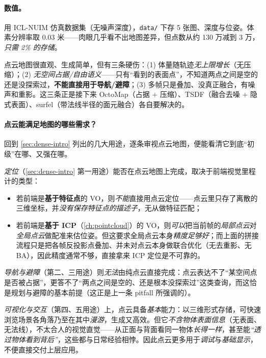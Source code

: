 \paragraph{数值。}
用 ICL-NUIM 仿真数据集（无噪声深度），\texttt{data/} 下存 5 张图、深度与位姿。体素分辨率取 0.03 米——肉眼几乎看不出地图差异，但点数从约 130 万减到 3 万，\emph{只需 2\% 的存储}\cite{gaoxiang2019slam14}。

\begin{pitfall}
点云地图很直观、生成简单，但有三条硬伤：(1) 体量随轨迹\emph{无上限增长}（无压缩）；(2) \emph{无空间占据/自由语义}——只有“看到的表面点”，不知道两点之间是空的还是没探索过，\textbf{不能直接用于导航/避障}；(3) 多帧只是叠加、没真正融合，有噪声和重影。这三条正是接下来 OctoMap（占据 $+$ 压缩）、TSDF（融合去噪 $+$ 隐式表面）、surfel（带法线半径的面元融合）各自要解决的。
\end{pitfall}

\paragraph{点云能满足地图的哪些需求？}
回到 \cref{sec:dense-intro} 列出的几大用途，逐条审视点云地图，便能看清它到底“初级”在哪、又强在哪。

\emph{定位}（\cref{sec:dense-intro} 第一用途）能否在点云地图上完成，取决于前端视觉里程计的类型：
\begin{itemize}
  \item 若前端是\textbf{基于特征点}的 VO，则\emph{不能}直接用点云定位——点云里只存了离散的三维坐标，并\emph{没有保存特征点的描述子}，无从做特征匹配；
  \item 若前端是\textbf{基于 ICP}（\cref{ch:pointcloud}）的 VO，则\emph{可以}把当前帧的\emph{局部点云}对\emph{全局点云}做配准来估位姿。但这要求全局点云本身\emph{精度足够好}；而上面的拼接流程只是把各帧反投影点叠加、并未对点云本身做联合优化（无去重影、无 BA），因此精度通常不够，直接拿来 ICP 定位是不可靠的。
\end{itemize}
\emph{导航与避障}（第二、三用途）则\emph{无法}由纯点云直接完成：点云表达不了“某空间点是否被占据”，更答不了“两点之间是空的、还是根本没探索过”这类查询，而这恰是规划与避障的基本前提（这正是上一条 pitfall 所强调的）。

\emph{可视化与交互}（第四、五用途）上，点云具备\emph{基本}能力：以三维形式存储，可快速浏览场景各角落乃至在其中\emph{漫游}，生成又高效。但它\emph{不含物体表面信息}（无表面、无法线），不太合人的视觉直觉——从正面与背面看同一物体\emph{长得一样}，甚至能\emph{“透过物体看到背后”}，这些都与日常经验相悖。因此点云更多用于\emph{调试}与\emph{基础显示}，不便直接交付上层应用。

